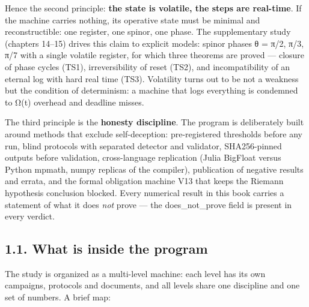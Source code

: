 \documentclass[11pt,a4paper]{article}
\begin{document}
Hence the second principle: \textbf{the state is volatile, the steps are real-time}. If the machine carries nothing, its operative state must be minimal and reconstructible: one register, one spinor, one phase. The supplementary study (chapters 14–15) drives this claim to explicit models: spinor phases θ = π/2, π/3, π/7 with a single volatile register, for which three theorems are proved — closure of phase cycles (TS1), irreversibility of reset (TS2), and incompatibility of an eternal log with hard real time (TS3). Volatility turns out to be not a weakness but the condition of determinism: a machine that logs everything is condemned to Ω(t) overhead and deadline misses.

The third principle is the \textbf{honesty discipline}. The program is deliberately built around methods that exclude self-deception: pre-registered thresholds before any run, blind protocols with separated detector and validator, SHA256-pinned outputs before validation, cross-language replication (Julia BigFloat versus Python mpmath, numpy replicas of the compiler), publication of negative results and errata, and the formal obligation machine V13 that keeps the Riemann hypothesis conclusion blocked. Every numerical result in this book carries a statement of what it does \emph{not} prove — the does\_not\_prove field is present in every verdict.

\subsection{1.1. What is inside the program}

The study is organized as a multi-level machine: each level has its own campaigns, protocols and documents, and all levels share one discipline and one set of numbers. A brief map:
\end{document}
